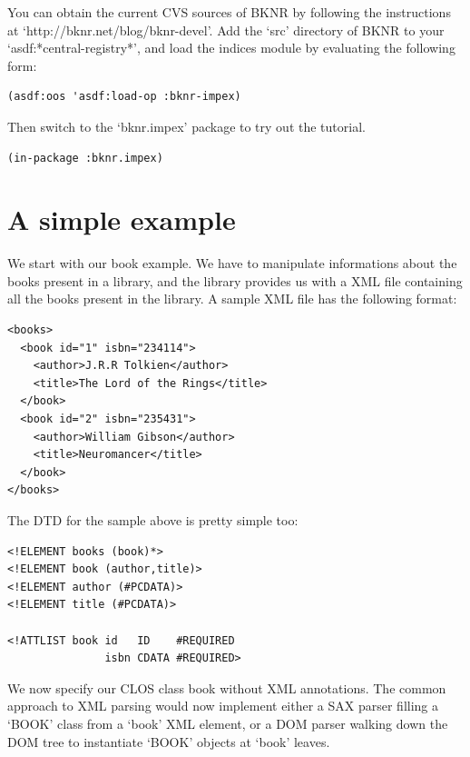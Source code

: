 You can obtain the current CVS sources of BKNR by following the
instructions at `http://bknr.net/blog/bknr-devel'. Add the `src'
directory of BKNR to your `asdf:*central-registry*', and load the
indices module by evaluating the following form:

\begin{Verbatim}[fontsize=\small,frame=leftline,framerule=0.9mm,rulecolor=\color{gray},framesep=5.1mm,xleftmargin=5mm,fontfamily=cmtt]
(asdf:oos 'asdf:load-op :bknr-impex)
\end{Verbatim}
Then switch to the `bknr.impex' package to try out the tutorial.

\begin{Verbatim}[fontsize=\small,frame=leftline,framerule=0.9mm,rulecolor=\color{gray},framesep=5.1mm,xleftmargin=5mm,fontfamily=cmtt]
(in-package :bknr.impex)
\end{Verbatim}


\section{ A simple example}

We start with our book example. We have to manipulate informations
about the books present in a library, and the library provides us
with a XML file containing all the books present in the library. A
sample XML file has the following format:

\begin{Verbatim}[fontsize=\small,frame=leftline,framerule=0.9mm,rulecolor=\color{gray},framesep=5.1mm,xleftmargin=5mm,fontfamily=cmtt]
<books>
  <book id="1" isbn="234114">
    <author>J.R.R Tolkien</author>
    <title>The Lord of the Rings</title>
  </book>
  <book id="2" isbn="235431">
    <author>William Gibson</author>
    <title>Neuromancer</title>
  </book>
</books>
\end{Verbatim}
The DTD for the sample above is pretty simple too:

\begin{Verbatim}[fontsize=\small,frame=leftline,framerule=0.9mm,rulecolor=\color{gray},framesep=5.1mm,xleftmargin=5mm,fontfamily=cmtt]
<!ELEMENT books (book)*>
<!ELEMENT book (author,title)>
<!ELEMENT author (#PCDATA)>
<!ELEMENT title (#PCDATA)>

<!ATTLIST book id   ID    #REQUIRED
               isbn CDATA #REQUIRED>
\end{Verbatim}
We now specify our CLOS class book without XML annotations. The
common approach to XML parsing would now implement either a SAX
parser filling a `BOOK' class from a `book' XML element, or a DOM
parser walking down the DOM tree to instantiate `BOOK' objects at
`book' leaves.

